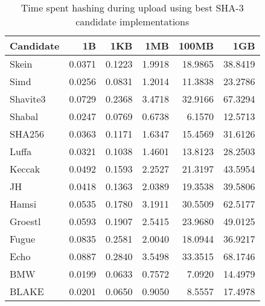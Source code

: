 \begin{table} 
  \centering 
    \begin{tabular}{ | l | r | r | r | r | r | }
      \hline
      \textbf{Candidate} & \textbf{1B} & \textbf{1KB} & \textbf{1MB} & \textbf{100MB} & \textbf{1GB} \\ \hline
      Skein & 0.0371 & 0.1223 & 1.9918 & 18.9865 & 38.8419 \\ \hline
      Simd & 0.0256 & 0.0831 & 1.2014 & 11.3838 & 23.2786 \\ \hline
      Shavite3 & 0.0729 & 0.2368 & 3.4718 & 32.9166 & 67.3294 \\ \hline
      Shabal & 0.0247 & 0.0769 & 0.6738 & 6.1570 & 12.5713 \\ \hline
      SHA256 & 0.0363 & 0.1171 & 1.6347 & 15.4569 & 31.6126 \\ \hline
      Luffa & 0.0321 & 0.1038 & 1.4601 & 13.8123 & 28.2503 \\ \hline
      Keccak & 0.0492 & 0.1593 & 2.2527 & 21.3197 & 43.5954 \\ \hline
      JH & 0.0418 & 0.1363 & 2.0389 & 19.3538 & 39.5806 \\ \hline
      Hamsi & 0.0535 & 0.1780 & 3.1911 & 30.5509 & 62.5177 \\ \hline
      Groestl & 0.0593 & 0.1907 & 2.5415 & 23.9680 & 49.0125 \\ \hline
      Fugue & 0.0835 & 0.2581 & 2.0040 & 18.0944 & 36.9217 \\ \hline
      Echo & 0.0887 & 0.2840 & 3.5498 & 33.3515 & 68.1746 \\ \hline
      BMW & 0.0199 & 0.0633 & 0.7572 & 7.0920 & 14.4979 \\ \hline
      BLAKE & 0.0201 & 0.0650 & 0.9050 & 8.5557 & 17.4978 \\ \hline
      \end{tabular} 
      \caption{Time spent hashing during upload using best SHA-3 candidate implementations}
      \label{tbl:tahoe:optimized_p}
\end{table}
